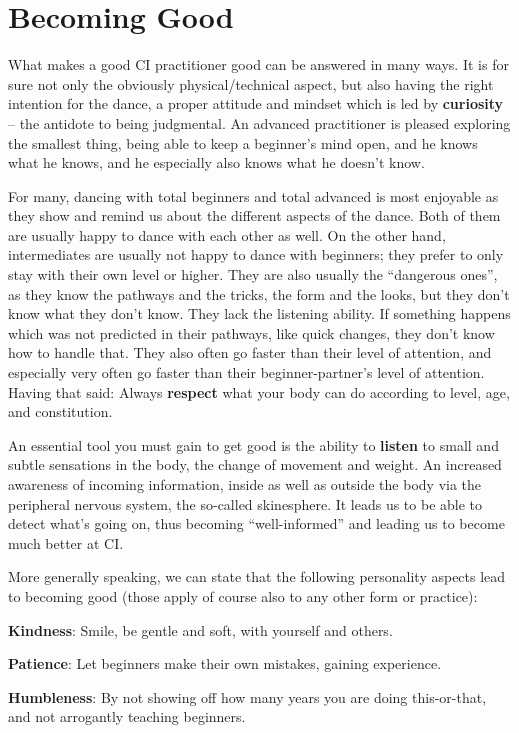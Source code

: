 \section{Becoming Good}\label{sec:becoming-good}

What makes a good CI practitioner good can be answered in many ways.
It is for sure not only the obviously physical/technical aspect, but also having the right intention for the dance, a proper attitude and mindset which is led by \textbf{curiosity} -- the antidote to being judgmental.
An advanced practitioner is pleased exploring the smallest thing, being able to keep a beginner's mind open, and he knows what he knows, and he especially also knows what he doesn't know.

For many, dancing with total beginners and total advanced is most enjoyable as they show and remind us about the different aspects of the dance.
Both of them are usually happy to dance with each other as well.
On the other hand, intermediates are usually not happy to dance with beginners; they prefer to only stay with their own level or higher.
They are also usually the ``dangerous ones'', as they know the pathways and the tricks, the form and the looks, but they don't know what they don't know.
They lack the listening ability.
If something happens which was not predicted in their pathways, like quick changes, they don't know how to handle that.
They also often go faster than their level of attention, and especially very often go faster than their beginner-partner's level of attention.
Having that said: Always \textbf{respect} what your body can do according to level, age, and constitution.

An essential tool you must gain to get good is the ability to \textbf{listen} to small and subtle sensations in the body, the change of movement and weight.
An increased awareness of incoming information, inside as well as outside the body via the peripheral nervous system, the so-called \gls{skinesphere}.
It leads us to be able to detect what's going on, thus becoming ``well-informed'' and leading us to become much better at CI.

More generally speaking, we can state that the following personality aspects lead to becoming good (those apply of course also to any other form or practice):

\begin{itemize*}
    \item [] \textbf{Kindness}: Smile, be gentle and soft, with yourself and others.
    \item [] \textbf{Patience}: Let beginners make their own mistakes, gaining experience.
    \item [] \textbf{Humbleness}: By not showing off how many years you are doing this-or-that, and not arrogantly teaching beginners.
\end{itemize*}

